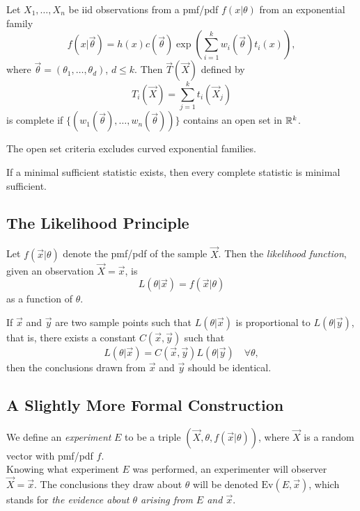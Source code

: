 \begin{theorem}
    Let $X_1, \dots, X_n$ be iid observations from a pmf/pdf $f(x \vert{} \theta)$ from an exponential family 
    \[
        f(x|\vec{\theta}) = h(x)c(\vec{\theta})\exp\left( \sum_{i=1}^k w_i(\vec{\theta}) t_i(x) \right),
    \]
    where $\vec{\theta} = (\theta_1, \dots, \theta_d)$, $d \leq k$. Then $\vec{T}(\vec{X})$ defined by
    \[
        T_i(\vec{X}) = \sum_{j=1}^k t_i(\vec{X}_j)
    \]
    is complete if $\{(w_1(\vec{\theta}), \dots, w_n(\vec{\theta}))\}$ contains an open set in $\mathbb{R}{}^k$.
\end{theorem}

\begin{remark}
    The open set criteria excludes curved exponential families.
\end{remark}

\begin{theorem}
    If a minimal sufficient statistic exists, then every complete statistic is minimal sufficient.
\end{theorem}


    
\subsection{The Likelihood Principle}

\begin{definition}[Likelihood]
    Let $f(\vec{x}\vert{} \theta)$ denote the pmf/pdf of the sample $\vec{X}$. Then the \emph{likelihood function}, given an observation $\vec{X} = \vec{x}$, is
    \[
        L(\theta \vert{} \vec{x}) = f(\vec{x} \vert{} \theta)
    \]
    as a function of $\theta$.
\end{definition}

\begin{definition}
    If $\vec{x}$ and $\vec{y}$ are two sample points such that $L(\theta \vert{} \vec{x})$ is proportional to $L(\theta \vert{} \vec{y})$, that is, there exists a constant $C(\vec{x}, \vec{y})$ such that 
    \[
        L(\theta \vert{} \vec{x}) = C(\vec{x}, \vec{y})L(\theta \vert{} \vec{y}) \quad \forall \theta,
    \]
    then the conclusions drawn from $\vec{x}$ and $\vec{y}$ should be identical.
\end{definition}

\subsection{A Slightly More Formal Construction}
\begin{definition}[Experiment]
    We define an \emph{experiment} $E$ to be a triple $(\vec{X}, \theta, f(\vec{x}\vert{}\theta))$, where $\vec{X}$ is a random vector with pmf/pdf $f$.\\
    
    Knowing what experiment $E$ was performed, an experimenter will observer $\vec{X} = \vec{x}$. The conclusions they draw about $\theta$ will be denoted $\text{Ev}(E, \vec{x})$, which stands for \emph{the evidence about $\theta$ arising from $E$ and $\vec{x}$}.
\end{definition}

